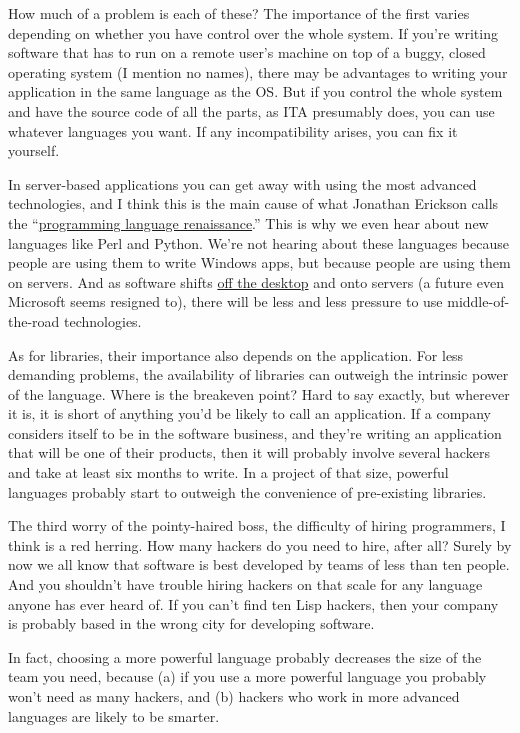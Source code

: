 \documentclass[12pt]{book}
\begin{document}
How much of a problem is each of these? The importance of the first
varies depending on whether you have control over the whole system. If
you're writing software that has to run on a remote user's machine on
top of a buggy, closed operating system (I mention no names), there may
be advantages to writing your application in the same language as the
OS. But if you control the whole system and have the source code of all
the parts, as ITA presumably does, you can use whatever languages you
want. If any incompatibility arises, you can fix it yourself.

In server-based applications you can get away with using the most
advanced technologies, and I think this is the main cause of what
Jonathan Erickson calls the
``\href{http://www.byte.com/documents/s=1821/byt20011214s0003/}{programming
language renaissance}.'' This is why we even hear about new languages
like Perl and Python. We're not hearing about these languages because
people are using them to write Windows apps, but because people are
using them on servers. And as software shifts \href{road.html}{off the
desktop} and onto servers (a future even Microsoft seems resigned to),
there will be less and less pressure to use middle-of-the-road
technologies.

As for libraries, their importance also depends on the application. For
less demanding problems, the availability of libraries can outweigh the
intrinsic power of the language. Where is the breakeven point? Hard to
say exactly, but wherever it is, it is short of anything you'd be likely
to call an application. If a company considers itself to be in the
software business, and they're writing an application that will be one
of their products, then it will probably involve several hackers and
take at least six months to write. In a project of that size, powerful
languages probably start to outweigh the convenience of pre-existing
libraries.

The third worry of the pointy-haired boss, the difficulty of hiring
programmers, I think is a red herring. How many hackers do you need to
hire, after all? Surely by now we all know that software is best
developed by teams of less than ten people. And you shouldn't have
trouble hiring hackers on that scale for any language anyone has ever
heard of. If you can't find ten Lisp hackers, then your company is
probably based in the wrong city for developing software.

In fact, choosing a more powerful language probably decreases the size
of the team you need, because (a) if you use a more powerful language
you probably won't need as many hackers, and (b) hackers who work in
more advanced languages are likely to be smarter.
\end{document}
